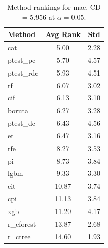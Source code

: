 \begin{table}[h]
\centering
\caption{Method rankings for mae. CD = 5.956 at $\alpha=0.05$.}
\label{tab:ranks_mae}
\begin{tabular}{lcc}
\toprule
Method & Avg Rank & Std \\
\midrule
cat & 5.00 & 2.28 \\
ptest_pc & 5.70 & 4.57 \\
ptest_rdc & 5.93 & 4.51 \\
rf & 6.07 & 3.02 \\
cif & 6.13 & 3.10 \\
boruta & 6.27 & 3.28 \\
ptest_dc & 6.43 & 4.56 \\
et & 6.47 & 3.16 \\
rfe & 8.27 & 3.53 \\
pi & 8.73 & 3.84 \\
lgbm & 9.33 & 3.30 \\
cit & 10.87 & 3.74 \\
cpi & 11.13 & 3.84 \\
xgb & 11.20 & 4.17 \\
r_cforest & 13.87 & 2.68 \\
r_ctree & 14.60 & 1.93 \\
\bottomrule
\end{tabular}
\end{table}